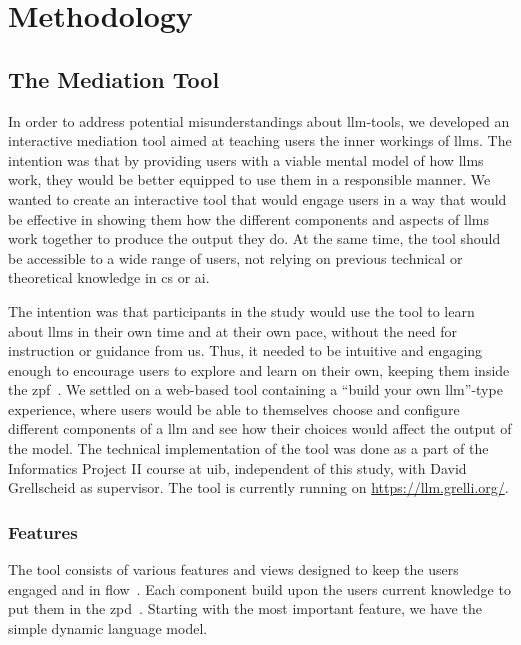 \chapter{Methodology}\label{methodology}

\section{The Mediation Tool}
In order to address potential misunderstandings about \gls{llm}-tools, we developed an interactive mediation tool aimed at teaching users the inner workings of \gls{llms}. The intention was that by providing users with a viable mental model of how \gls{llms} work, they would be better equipped to use them in a responsible manner. We wanted to create an interactive tool that would engage users in a way that would be effective in showing them how the different components and aspects of \gls{llms} work together to produce the output they do. At the same time, the tool should be accessible to a wide range of users, not relying on previous technical or theoretical knowledge in \gls{cs} or \gls{ai}.

The intention was that participants in the study would use the tool to learn about \gls{llms} in their own time and at their own pace, without the need for instruction or guidance from us. Thus, it needed to be intuitive and engaging enough to encourage users to explore and learn on their own, keeping them inside the \acrfull{zpf}~\cite{basawapatna_zones_2013}. We settled on a web-based tool containing a ``build your own \gls{llm}''-type experience, where users would be able to themselves choose and configure different components of a \gls{llm} and see how their choices would affect the output of the model. The technical implementation of the tool was done as a part of the Informatics Project II course at \gls{uib}, independent of this study, with David Grellscheid as supervisor. The tool is currently running on \url{https://llm.grelli.org/}.

\subsection{Features}
The tool consists of various features and views designed to keep the users engaged and in flow~\cite{csikszentmihalyi_beyond_1977}. Each component build upon the users current knowledge to put them in the \acrfull{zpd}~\cite{vygotskij_mind_1981}. Starting with the most important feature, we have the simple dynamic language model.

